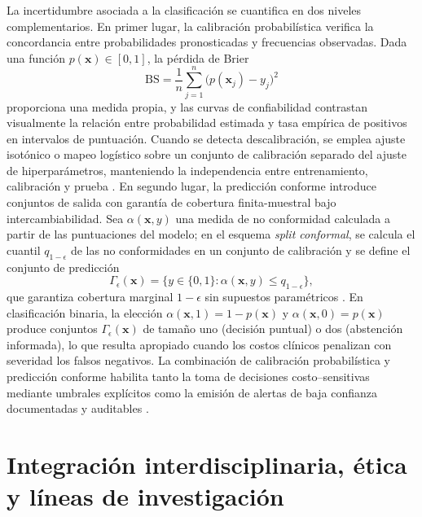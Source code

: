 La incertidumbre asociada a la clasificación se cuantifica en dos niveles complementarios. En primer lugar, la calibración probabilística verifica la concordancia entre probabilidades pronosticadas y frecuencias observadas. Dada una función \(p(\mathbf{x})\in[0,1]\), la pérdida de Brier
\begin{equation}
\mathrm{BS}=\frac{1}{n}\sum_{j=1}^{n}\bigl(p(\mathbf{x}_{j})-y_{j}\bigr)^{2}
\end{equation}
proporciona una medida propia, y las curvas de confiabilidad contrastan visualmente la relación entre probabilidad estimada y tasa empírica de positivos en intervalos de puntuación. Cuando se detecta descalibración, se emplea ajuste isotónico o mapeo logístico sobre un conjunto de calibración separado del ajuste de hiperparámetros, manteniendo la independencia entre entrenamiento, calibración y prueba \cite{Pedregosa2011}. En segundo lugar, la predicción conforme introduce conjuntos de salida con garantía de cobertura finita-muestral bajo intercambiabilidad. Sea \(\alpha(\mathbf{x},y)\) una medida de no conformidad calculada a partir de las puntuaciones del modelo; en el esquema \emph{split conformal}, se calcula el cuantil \(q_{1-\epsilon}\) de las no conformidades en un conjunto de calibración y se define el conjunto de predicción
\begin{equation}
\Gamma_{\epsilon}(\mathbf{x})=\bigl\{y\in\{0,1\}:\alpha(\mathbf{x},y)\le q_{1-\epsilon}\bigr\},
\end{equation}
que garantiza cobertura marginal \(1-\epsilon\) sin supuestos paramétricos \cite{Montero2024}. En clasificación binaria, la elección \(\alpha(\mathbf{x},1)=1-p(\mathbf{x})\) y \(\alpha(\mathbf{x},0)=p(\mathbf{x})\) produce conjuntos \(\Gamma_{\epsilon}(\mathbf{x})\) de tamaño uno (decisión puntual) o dos (abstención informada), lo que resulta apropiado cuando los costos clínicos penalizan con severidad los falsos negativos. La combinación de calibración probabilística y predicción conforme habilita tanto la toma de decisiones costo–sensitivas mediante umbrales explícitos como la emisión de alertas de baja confianza documentadas y auditables \cite{Montero2024,Pedregosa2011}.

\section{Integración interdisciplinaria, ética y líneas de investigación}


